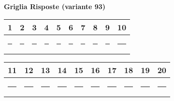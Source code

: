 \documentclass{exam}%
\newcounter{variant}%
\begin{document}
%
\normalsize%
\setcounter{variant}{93}%
\noindent \textbf{  }%
\bigskip%
\noindent\textbf{Griglia Risposte (variante 93)}%
\begin{center}
\begin{tabular}{|c|c|c|c|c|c|c|c|c|c|}
\hline
1 & 2 & 3 & 4 & 5 & 6 & 7 & 8 & 9 & 10 \\ \hline
\rule{1cm}{0pt}\rule[-0.5em]{0pt}{1.5em} & \rule{1cm}{0pt}\rule[-0.5em]{0pt}{1.5em} & \rule{1cm}{0pt}\rule[-0.5em]{0pt}{1.5em} & \rule{1cm}{0pt}\rule[-0.5em]{0pt}{1.5em} & \rule{1cm}{0pt}\rule[-0.5em]{0pt}{1.5em} & \rule{1cm}{0pt}\rule[-0.5em]{0pt}{1.5em} & \rule{1cm}{0pt}\rule[-0.5em]{0pt}{1.5em} & \rule{1cm}{0pt}\rule[-0.5em]{0pt}{1.5em} & \rule{1cm}{0pt}\rule[-0.5em]{0pt}{1.5em} & \rule{1cm}{0pt}\rule[-0.5em]{0pt}{1.5em} \\ \hline
\end{tabular}
\end{center}%
\vspace{0.3em}%
\begin{center}
\begin{tabular}{|c|c|c|c|c|c|c|c|c|c|}
\hline
11 & 12 & 13 & 14 & 15 & 16 & 17 & 18 & 19 & 20 \\ \hline
\rule{1cm}{0pt}\rule[-0.5em]{0pt}{1.5em} & \rule{1cm}{0pt}\rule[-0.5em]{0pt}{1.5em} & \rule{1cm}{0pt}\rule[-0.5em]{0pt}{1.5em} & \rule{1cm}{0pt}\rule[-0.5em]{0pt}{1.5em} & \rule{1cm}{0pt}\rule[-0.5em]{0pt}{1.5em} & \rule{1cm}{0pt}\rule[-0.5em]{0pt}{1.5em} & \rule{1cm}{0pt}\rule[-0.5em]{0pt}{1.5em} & \rule{1cm}{0pt}\rule[-0.5em]{0pt}{1.5em} & \rule{1cm}{0pt}\rule[-0.5em]{0pt}{1.5em} & \rule{1cm}{0pt}\rule[-0.5em]{0pt}{1.5em} \\ \hline
\end{tabular}
\end{center}%
\vspace{1em}%
\end{document}
